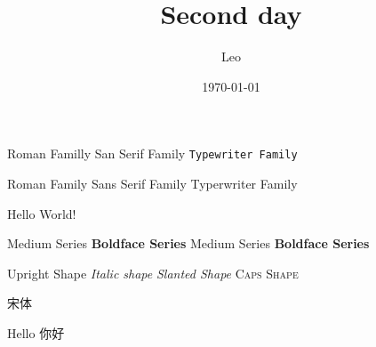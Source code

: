 \documentclass{article}[12pt]
\title{Second day}
\author{Leo}
\date{\today}
\begin{document}
\maketitle

\textrm{Roman Familly} \textsf{San Serif Family} \texttt{Typewriter Family}


{\rmfamily Roman Family} {\sffamily Sans Serif Family} {\ttfamily Typerwriter Family}

\sffamily Hello World!

\textmd{Medium Series} \textbf{Boldface Series}
{\mdseries Medium Series} {\bfseries Boldface Series}

\textup{Upright Shape} \textit{Italic shape}
\textsl{Slanted Shape} \textsc{Caps Shape}

{\songti 宋体}  

{\tiny Hello}
{你好}
\end{document}
